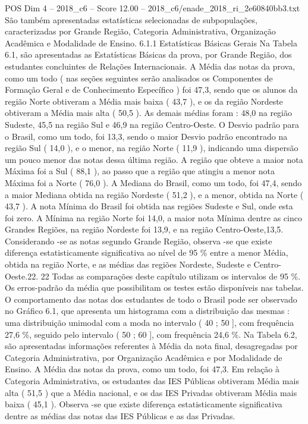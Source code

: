 \begin{textsample}{POS Dim 4 – 2018\_c6 – Score 12.00 – 2018\_c6/enade\_2018\_ri\_2e60840bb3.txt}
São também apresentadas estatísticas selecionadas de subpopulações, caracterizadas por Grande Região, Categoria Administrativa, Organização Acadêmica e Modalidade de Ensino. 6.1.1 Estatísticas Básicas Gerais Na Tabela 6.1, são apresentadas as Estatísticas Básicas da prova, por Grande Região, dos estudantes concluintes de Relações Internacionais.
A Média das notas da prova, como um todo ( nas seções seguintes serão analisados os Componentes de Formação Geral e de Conhecimento Específico ) foi 47,3, sendo que os alunos da região Norte obtiveram a Média mais baixa ( 43,7 ), e os da região Nordeste obtiveram a Média mais alta ( 50,5 ).
As demais médias foram : 48,0 na região Sudeste, 45,5 na região Sul e 46,9 na região Centro-Oeste.
O Desvio padrão para o Brasil, como um todo, foi 13,3, sendo o maior Desvio padrão encontrado na região Sul ( 14,0 ), e o menor, na região Norte ( 11,9 ), indicando uma dispersão um pouco menor das notas dessa última região.
A região que obteve a maior nota Máxima foi a Sul ( 88,1 ), ao passo que a região que atingiu a menor nota Máxima foi a Norte ( 76,0 ).
A Mediana do Brasil, como um todo, foi 47,4, sendo a maior Mediana obtida na região Nordeste ( 51,2 ), e a menor, obtida na Norte ( 43,7 ).
A nota Mínima do Brasil foi obtida nas regiões Sudeste e Sul, onde esta foi zero.
A Mínima na região Norte foi 14,0, a maior nota Mínima dentre as cinco Grandes Regiões, na região Nordeste foi 13,9, e na região Centro-Oeste,13,5.
Considerando -se as notas segundo Grande Região, observa -se que existe diferença estatisticamente significativa ao nível de 95 \% entre a menor Média, obtida na região Norte, e as médias das regiões Nordeste, Sudeste e Centro-Oeste.22. 22 Todas as comparações deste capítulo utilizam os intervalos de 95 \%.
Os erros-padrão da média que possibilitam os testes estão disponíveis nas tabelas.
O comportamento das notas dos estudantes de todo o Brasil pode ser observado no Gráfico 6.1, que apresenta um histograma com a distribuição das mesmas : uma distribuição unimodal com a moda no intervalo ( 40 ; 50 ], com frequência 27,6 \%, seguido pelo intervalo ( 50 ; 60 ], com frequência 24,6 \%.
Na Tabela 6.2, são apresentadas informações referentes à Média da nota final, desagregadas por Categoria Administrativa, por Organização Acadêmica e por Modalidade de Ensino.
A Média das notas da prova, como um todo, foi 47,3.
Em relação à Categoria Administrativa, os estudantes das IES Públicas obtiveram Média mais alta ( 51,5 ) que a Média nacional, e os das IES Privadas obtiveram Média mais baixa ( 45,1 ).
Observa -se que existe diferença estatisticamente significativa dentre as médias das notas das IES Públicas e as das Privadas.

\end{textsample}
